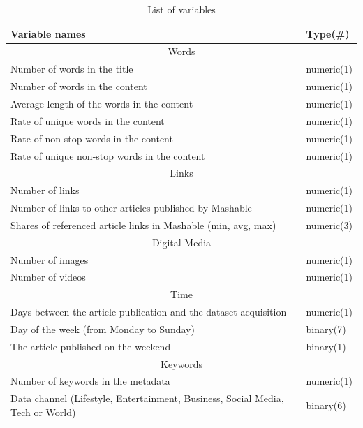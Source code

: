 \documentclass[11pt]{article}
\begin{document}
    \begin{table}[h]
        \centering
        \caption{List of variables}
        \begin{tabular}{ l | l }
            \hline\hline
            Variable names & Type(\#)\\
            \hline
            \multicolumn{2}{c}{Words}\\
            \hline
            Number of words in the title & numeric(1) \\
            Number of words in the content & numeric(1) \\
            Average length of the words in the content & numeric(1) \\
            Rate of unique words in the content & numeric(1) \\
            Rate of non-stop words in the content & numeric(1) \\
            Rate of unique non-stop words in the content & numeric(1) \\
            \hline
            \multicolumn{2}{c}{Links}\\
            \hline
            Number of links & numeric(1) \\
            Number of links to other articles published by Mashable & numeric(1) \\
            Shares of referenced article links in Mashable (min, avg, max) & numeric(3) \\
            \hline
            \multicolumn{2}{c}{Digital Media}\\
            \hline
            Number of images & numeric(1) \\
            Number of videos & numeric(1) \\
            \hline
            \multicolumn{2}{c}{Time}\\
            \hline
            Days between the article publication and the dataset acquisition & numeric(1) \\
            Day of the week (from Monday to Sunday) & binary(7) \\
            The article published on the weekend & binary(1) \\
            \hline
            \multicolumn{2}{c}{Keywords}\\
            \hline
            Number of keywords in the metadata & numeric(1) \\
            Data channel (Lifestyle, Entertainment, Business, Social Media, Tech or World) & binary(6) \\

\end{tabular}
\end{table}
\end{document}
